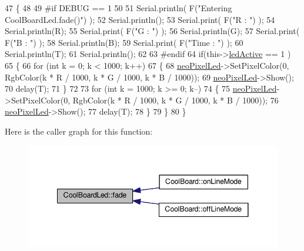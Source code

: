 \begin{DoxyCode}
47 \{
48 
49 \textcolor{preprocessor}{#if DEBUG == 1}
50 
51     Serial.println( F(\textcolor{stringliteral}{"Entering CoolBoardLed.fade()"}) );
52     Serial.println();
53     Serial.print( F(\textcolor{stringliteral}{"R : "}) );
54     Serial.println(R);
55     Serial.print( F(\textcolor{stringliteral}{"G : "}) );
56     Serial.println(G);
57     Serial.print( F(\textcolor{stringliteral}{"B : "}) );
58     Serial.println(B);
59     Serial.print( F(\textcolor{stringliteral}{"Time : "}) );
60     Serial.println(T);
61     Serial.println();
62 
63 \textcolor{preprocessor}{#endif  }
64     \textcolor{keywordflow}{if}(this->\hyperlink{class_cool_board_led_aadd04d2ecf123247718d77f42fba7f08}{ledActive} == 1 )
65     \{
66         \textcolor{keywordflow}{for} (\textcolor{keywordtype}{int} k = 0; k < 1000; k++) 
67         \{
68             \hyperlink{class_cool_board_led_ac2c13fa462a010cd9242bf297c013923}{neoPixelLed}->SetPixelColor(0, RgbColor(k * R / 1000, k * G / 1000, k * B / 1000));
69             \hyperlink{class_cool_board_led_ac2c13fa462a010cd9242bf297c013923}{neoPixelLed}->Show();
70             delay(T);
71         \}
72         
73         \textcolor{keywordflow}{for} (\textcolor{keywordtype}{int} k = 1000; k >= 0; k--) 
74         \{
75             \hyperlink{class_cool_board_led_ac2c13fa462a010cd9242bf297c013923}{neoPixelLed}->SetPixelColor(0, RgbColor(k * R / 1000, k * G / 1000, k * B / 1000));
76             \hyperlink{class_cool_board_led_ac2c13fa462a010cd9242bf297c013923}{neoPixelLed}->Show();
77             delay(T);
78         \}
79     \}
80 \}
\end{DoxyCode}
Here is the caller graph for this function\+:\nopagebreak
\begin{figure}[H]
\begin{center}
\leavevmode
\includegraphics[width=341pt]{de/dc0/class_cool_board_led_af1cacbaa88db8bcf6042c1083ba41155_icgraph}
\end{center}
\end{figure}
\mbox{\label{class_cool_board_led_ab778f5e7bed0ab74e3906d82110493c3}} 
